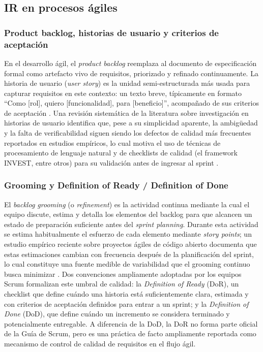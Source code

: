 \documentclass[journal,onecolumn]{IEEEtran}
\begin{document}
	\subsection{IR en procesos ágiles}
	
	\subsubsection{Product backlog, historias de usuario y criterios de aceptación}
	
	En el desarrollo ágil, el \emph{product backlog} reemplaza al documento de especificación formal como artefacto vivo de requisitos, priorizado y refinado continuamente. La historia de usuario (\emph{user story}) es la unidad semi-estructurada más usada para capturar requisitos en este contexto: un texto breve, típicamente en formato ``Como [rol], quiero [funcionalidad], para [beneficio]'', acompañado de sus criterios de aceptación \cite{raharjana2021}. Una revisión sistemática de la literatura sobre investigación en historias de usuario identifica que, pese a su simplicidad aparente, la ambigüedad y la falta de verificabilidad siguen siendo los defectos de calidad más frecuentes reportados en estudios empíricos, lo cual motiva el uso de técnicas de procesamiento de lenguaje natural y de checklists de calidad (el framework INVEST, entre otros) para su validación antes de ingresar al sprint \cite{raharjana2021,amna2022}.
	
	\subsubsection{Grooming y Definition of Ready / Definition of Done}
	
	El \emph{backlog grooming} (o \emph{refinement}) es la actividad continua mediante la cual el equipo discute, estima y detalla los elementos del backlog para que alcancen un estado de preparación suficiente antes del \emph{sprint planning}. Durante esta actividad se estima habitualmente el esfuerzo de cada elemento mediante \emph{story points}; un estudio empírico reciente sobre proyectos ágiles de código abierto documenta que estas estimaciones cambian con frecuencia después de la planificación del sprint, lo cual constituye una fuente medible de variabilidad que el grooming continuo busca minimizar \cite{pasuksmit2022}. Dos convenciones ampliamente adoptadas por los equipos Scrum formalizan este umbral de calidad: la \emph{Definition of Ready} (DoR), un checklist que define cuándo una historia está suficientemente clara, estimada y con criterios de aceptación definidos para entrar a un sprint; y la \emph{Definition of Done} (DoD), que define cuándo un incremento se considera terminado y potencialmente entregable. A diferencia de la DoD, la DoR no forma parte oficial de la Guía de Scrum, pero es una práctica de facto ampliamente reportada como mecanismo de control de calidad de requisitos en el flujo ágil.
	
\end{document}
